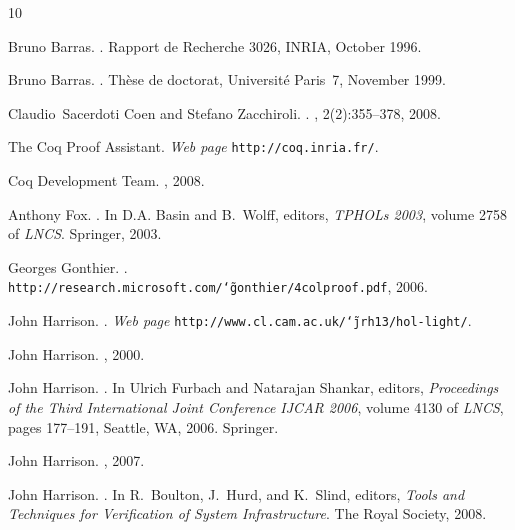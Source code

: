 \documentclass{entcs}
\begin{document}
\begin{thebibliography}{10}

Bruno Barras.
.
\newblock Rapport de Recherche 3026, INRIA, October 1996.

Bruno Barras.
.
\newblock Th{\`e}se de doctorat, Universit{\'e} Paris~7, November 1999.

Claudio~Sacerdoti Coen and Stefano Zacchiroli.
.
, 2(2):355--378, 2008.

{The Coq Proof Assistant}.
\newblock \emph{Web page} \texttt{http://coq.inria.fr/}.

{Coq Development Team}.
, 2008.

Anthony Fox.
.
\newblock In D.A. Basin and B.~Wolff, editors, {\em TPHOLs 2003}, volume 2758
  of {\em LNCS}. Springer, 2003.

Georges Gonthier.
.
\newblock \texttt{http://research.{}microsoft.com/\char`\~gonthier/4colproof.pdf}, 2006.

John Harrison.
.
\newblock \emph{Web page} \texttt{http://www.cl.cam.ac.uk/{}\char`\~jrh13/hol-light/}.

John Harrison.
, 2000.

John Harrison.
.
\newblock In Ulrich Furbach and Natarajan Shankar, editors, {\em Proceedings of
  the Third International Joint Conference IJCAR 2006}, volume 4130 of {\em
  LNCS}, pages 177--191, Seattle, WA, 2006. Springer.

John Harrison.
, 2007.

John Harrison.
.
\newblock In R.~Boulton, J.~Hurd, and K.~Slind, editors, {\em {Tools and
  Techniques for Verification of System Infrastructure}}. The Royal Society,
  2008.


\end{thebibliography}
\end{document}
